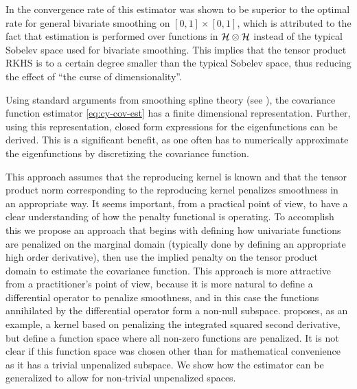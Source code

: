 In \cite{Cai:2010vr} the convergence rate of this estimator was shown to be superior to the optimal rate for general bivariate smoothing on $[0,1]\times[0,1]$, which is attributed to the fact that estimation is performed over functions in $\mathcal{H} \otimes \mathcal{H}$ instead of the typical Sobelev space used for bivariate smoothing. This implies that the tensor product RKHS is to a certain degree smaller than the typical Sobelev space, thus reducing the effect of ``the curse of dimensionality''.

Using standard arguments from smoothing spline theory (see \cite{Wahba:1990}), the covariance function estimator \eqref{eq:cy-cov-est} has a finite dimensional representation. Further, using this representation, closed form expressions for the eigenfunctions can be derived. This is a significant benefit, as one often has to numerically approximate the eigenfunctions by discretizing the covariance function.

This approach assumes that the reproducing kernel is known and that the tensor product norm corresponding to the reproducing kernel penalizes smoothness in an appropriate way. It seems important, from a practical point of view, to have a clear understanding of how the penalty functional is operating. To accomplish this we propose an approach that begins with defining how univariate functions are penalized on the marginal domain (typically done by defining an appropriate high order derivative), then use the implied penalty on the tensor product domain to estimate the covariance function. This approach is more attractive from a practitioner's point of view, because it is more natural to define a differential operator to penalize smoothness, and in this case the functions annihilated by the differential operator form a non-null subspace. \cite{Cai:2010vr} proposes, as an example, a kernel based on penalizing the integrated squared second derivative, but define a function space where all non-zero functions are penalized. It is not clear if this function space was chosen other than for mathematical convenience as it has a trivial unpenalized subspace. We show how the estimator can be generalized to allow for non-trivial unpenalized spaces. 

